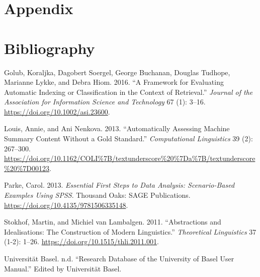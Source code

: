 \hypertarget{appendix}{%
\section{Appendix}\label{appendix}}

\hypertarget{bibliography}{%
\section{Bibliography}\label{bibliography}}

\hypertarget{refs}{}
\begin{CSLReferences}{1}{0}
\leavevmode\hypertarget{ref-Golub.2016}{}%
Golub, Koraljka, Dagobert Soergel, George Buchanan, Douglas Tudhope,
Marianne Lykke, and Debra Hiom. 2016. {``A Framework for Evaluating
Automatic Indexing or Classification in the Context of Retrieval.''}
\emph{Journal of the Association for Information Science and Technology}
67 (1): 3--16. \url{https://doi.org/10.1002/asi.23600}.

\leavevmode\hypertarget{ref-Louis.2013}{}%
Louis, Annie, and Ani Nenkova. 2013. {``Automatically Assessing Machine
Summary Content Without a Gold Standard.''} \emph{Computational
Linguistics} 39 (2): 267--300.
\url{https://doi.org/10.1162/COLI\%7B/textunderscore\%20\%7Da\%7B/textunderscore\%20\%7D00123}.

\leavevmode\hypertarget{ref-Parke.2013}{}%
Parke, Carol. 2013. \emph{Essential First Steps to Data Analysis:
Scenario-Based Examples Using SPSS}. Thousand Oaks: {SAGE Publications}.
\url{https://doi.org/10.4135/9781506335148}.

\leavevmode\hypertarget{ref-Stokhof.2011}{}%
Stokhof, Martin, and Michiel van Lambalgen. 2011. {``Abstractions and
Idealisations: The Construction of Modern Linguistics.''}
\emph{Theoretical Linguistics} 37 (1-2): 1--26.
\url{https://doi.org/10.1515/thli.2011.001}.

\leavevmode\hypertarget{ref-UniversitatBasel.2021}{}%
Universität Basel. n.d. {``Research Database of the University of Basel
User Manual.''} Edited by Universität Basel.

\end{CSLReferences}

